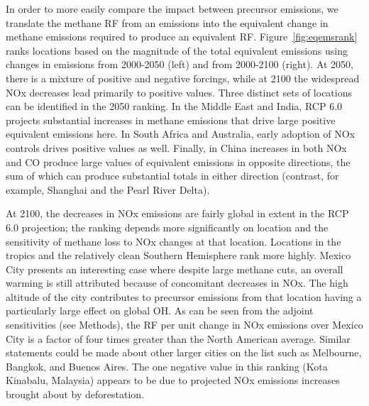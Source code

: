In order to more easily compare the impact between precursor emissions, we translate the methane RF from an emissions into the equivalent change in methane emissions required to produce an equivalent RF. Figure~\ref{fig:eqemsrank} ranks locations based on the magnitude of the total equivalent emissions using changes in emissions from 2000-2050 (left) and from 2000-2100 (right). At 2050, there is a mixture of positive and negative forcings, while at 2100 the widespread NOx decreases lead primarily to positive values. Three distinct sets of locations can be identified in the 2050 ranking. In the Middle East and India, RCP 6.0 projects substantial increases in methane emissions that drive large positive equivalent emissions here. In South Africa and Australia, early adoption of NOx controls drives positive values as well. Finally, in China increases in both NOx and CO produce large values of equivalent emissions in opposite directions, the sum of which can produce substantial totals in either direction (contrast, for example, Shanghai and the Pearl River Delta).

At 2100, the decreases in NOx emissions are fairly global in extent in the RCP 6.0 projection; the ranking depends more significantly on location and the sensitivity of methane loss to NOx changes at that location. Locations in the tropics and the relatively clean Southern Hemisphere rank more highly. Mexico City presents an interesting case where despite large methane cuts, an overall warming is still attributed because of concomitant decreases in NOx. The high altitude of the city contributes to precursor emissions from that location having a particularly large effect on global OH. As can be seen from the adjoint sensitivities (see Methods), the RF per unit change in NOx emissions over Mexico City is a factor of four times greater than the North American average. Similar statements could be made about other larger cities on the list such as Melbourne, Bangkok, and Buenos Aires. The one negative value in this ranking (Kota Kinabalu, Malaysia) appears to be due to projected NOx emissions increases brought about by deforestation.
